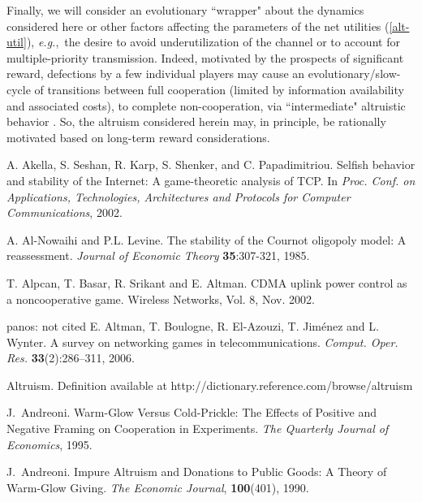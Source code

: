 \documentclass[12pt,onecolumn,draftcls]{IEEEtran}
\newcommand{\eg}{{\em e.g.},~}
\begin{document}
Finally, we will consider an evolutionary ``wrapper" about the dynamics
considered here or other factors affecting the parameters  of the net
utilities (\ref{alt-util}), \eg the desire to avoid underutilization of the
channel or to account for multiple-priority transmission.  Indeed,
motivated by the prospects of significant reward, defections  by  a few
individual players may cause an evolutionary/slow-cycle of transitions
between full cooperation (limited by information availability and
associated costs), to complete non-cooperation,
via ``intermediate" altruistic behavior \cite{Nowak06}.
So, the altruism considered herein may, in principle, be  rationally
motivated based on long-term reward considerations.



\begin{thebibliography}{9}

A. Akella, S. Seshan, R. Karp, S. Shenker, and C. Papadimitriou.
Selfish behavior and stability of
the Internet: A game-theoretic analysis of TCP.
In {\em Proc. Conf. on Applications, Technologies,
Architectures and Protocols for Computer Communications},
2002.

A. Al-Nowaihi and P.L. Levine.
The stability of the Cournot oligopoly model: A reassessment.
{\em Journal of Economic Theory}  {\bf 35}:307-321, 1985.

T. Alpcan, T. Basar, R. Srikant and E. Altman. 
CDMA uplink power control as a noncooperative game.
Wireless Networks, Vol. 8, Nov. 2002.




panos: not cited
 E. Altman, T. Boulogne,  R. El-Azouzi, T. Jim\'{e}nez and L. Wynter.
 A survey on networking games in telecommunications.
 {\em Comput. Oper. Res.}
 {\bf 33}(2):286--311, 2006.

Altruism. Definition available at
http://dictionary.reference.com/browse/altruism

J.~Andreoni.
Warm-Glow Versus Cold-Prickle: The Effects of Positive and Negative Framing on Cooperation in Experiments.
{\em The Quarterly Journal of Economics},
1995.

J.~Andreoni.
Impure Altruism and Donations to Public Goods: A Theory of Warm-Glow Giving.
{\em The Economic Journal}, {\bf 100}(401), 1990.






\end{thebibliography}
\end{document}

